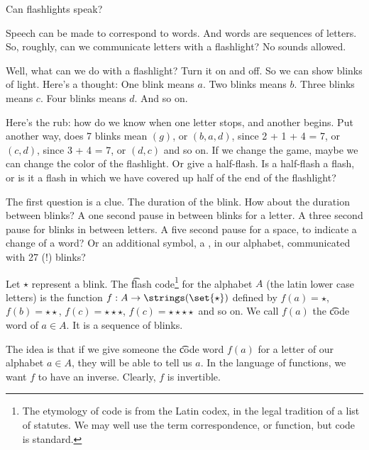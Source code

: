 

Can flashlights speak?

Speech can be made to correspond to words.
And words are sequences of letters.
So, roughly, can we communicate letters with a flashlight?
No sounds allowed.


Well, what can we do with a flashlight?
Turn it on and off.
So we can show blinks of light.
Here's a thought:
One blink means $a$.
Two blinks means $b$.
Three blinks means $c$.
Four blinks means $d$.
And so on.

Here's the rub: how do we know when one letter stops, and another begins.
Put another way, does 7 blinks mean $(g)$, or $(b, a, d)$, since 2 + 1 + 4 = 7, or $(c, d)$, since 3 + 4 = 7, or $(d, c)$ and so on.
If we change the game, maybe we can change the color of the flashlight.
Or give a half-flash.
Is a half-flash a  flash, or is it a flash in which we have covered up half of the end of the flashlight?

The first question is a clue.
The duration of the blink.
How about the duration between blinks?
A one second pause in between blinks for a letter.
A three second pause for blinks in between letters.
A five second pause for a space, to indicate a change of a word?
Or an additional symbol, a , in our alphabet, communicated with 27 (!) blinks?



\newcommand{\blink}{\star}
\newcommand{\pause}{\square}
Let $\blink$ represent a blink.
The \t{flash code}\footnote{The etymology of code is from the Latin codex, in the legal tradition of a list of statutes. We may well use the term correspondence, or function, but code is standard.} for the alphabet $A$ (the latin lower case letters) is the function $f: A \to \strings(\set{\blink})$ defined by $f(a) = \blink$, $f(b) = \blink\blink$, $f(c) = \blink\blink\blink$, $f(c) = \blink\blink\blink\blink$ and so on.
We call $f(a)$ the \t{code word} of $a \in A$.
It is a sequence of blinks.

The idea is that if we give someone the \t{code word} $f(a)$ for a letter of our alphabet $a \in A$, they will be able to tell us $a$.
In the language of functions, we want $f$ to have an inverse.
Clearly, $f$ is invertible.

